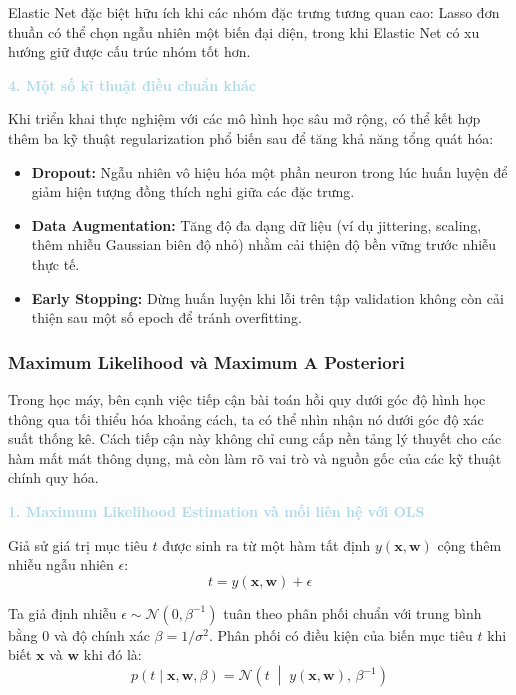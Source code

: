 Elastic Net đặc biệt hữu ích khi các nhóm đặc trưng tương quan cao: Lasso đơn thuần có thể
chọn ngẫu nhiên một biến đại diện, trong khi Elastic Net có xu hướng giữ được cấu trúc nhóm tốt hơn.

\noindent\textcolor{lightblue}{\textbf{4. Một số kĩ thuật điều chuẩn khác}}

Khi triển khai thực nghiệm với các mô hình học sâu mở rộng, có thể kết hợp thêm ba kỹ thuật regularization phổ biến sau để tăng khả năng tổng quát hóa:

\begin{itemize}
    \item \textbf{Dropout:} Ngẫu nhiên vô hiệu hóa một phần neuron trong lúc huấn luyện để giảm hiện tượng đồng thích nghi giữa các đặc trưng.
    \item \textbf{Data Augmentation:} Tăng độ đa dạng dữ liệu (ví dụ jittering, scaling, thêm nhiễu Gaussian biên độ nhỏ) nhằm cải thiện độ bền vững trước nhiễu thực tế.
    \item \textbf{Early Stopping:} Dừng huấn luyện khi lỗi trên tập validation không còn cải thiện sau một số epoch để tránh overfitting.
\end{itemize}

\subsubsection{Maximum Likelihood và Maximum A Posteriori}

Trong học máy, bên cạnh việc tiếp cận bài toán hồi quy dưới góc độ hình học thông qua tối thiểu hóa khoảng cách, ta có thể nhìn nhận nó dưới góc độ xác suất thống kê. 
Cách tiếp cận này không chỉ cung cấp nền tảng lý thuyết cho các hàm mất mát thông 
dụng, mà còn làm rõ vai trò và nguồn gốc của các kỹ thuật chính quy hóa\cite{bishop2006pattern}.

\noindent\textcolor{lightblue}{\textbf{1. Maximum Likelihood Estimation và mối liên hệ với OLS}}

Giả sử giá trị mục tiêu $t$ được sinh ra từ một hàm tất định 
$y(\boldsymbol{x}, \boldsymbol{w})$ cộng thêm nhiễu ngẫu nhiên $\epsilon$:
$$t = y(\boldsymbol{x}, \boldsymbol{w}) + \epsilon$$

Ta giả định nhiễu $\epsilon \sim \mathcal{N}(0, \beta^{-1})$ tuân theo phân phối 
chuẩn với trung bình bằng 0 và độ chính xác $\beta = 1/\sigma^2$. 
Phân phối có điều kiện của biến mục tiêu $t$ khi biết $\boldsymbol{x}$ và 
$\boldsymbol{w}$ khi đó là:
$$p(t \mid \boldsymbol{x}, \boldsymbol{w}, \beta) 
  = \mathcal{N}\!\left(t \;\middle|\; y(\boldsymbol{x}, \boldsymbol{w}),\, 
  \beta^{-1}\right)$$

